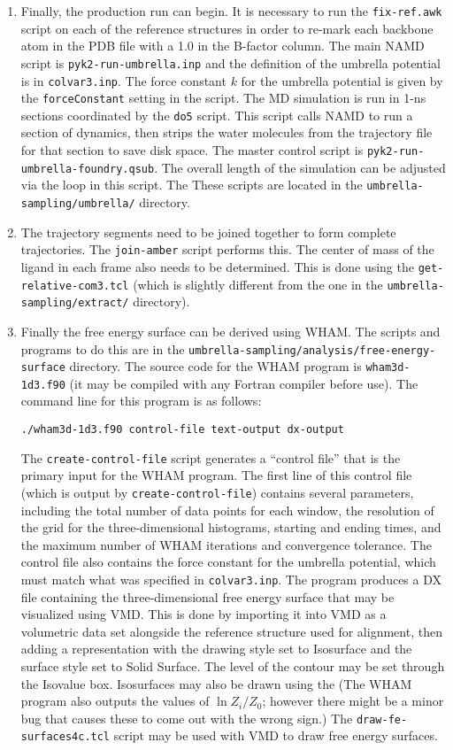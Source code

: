 \documentclass{article}      %
\begin{document}
\begin{enumerate}
\item Finally, the production run can begin.  It is necessary to run the \verb+fix-ref.awk+ script on each of the reference structures in order to re-mark each backbone atom in the PDB file with a 1.0 in the B-factor column.  The main NAMD script is \verb+pyk2-run-umbrella.inp+ and the definition of the umbrella potential is in \verb+colvar3.inp+.   The force constant $k$ for the umbrella potential is given by the \verb+forceConstant+ setting in the script.  The MD simulation is run in 1-ns sections coordinated by the \verb+do5+ script.   This script calls NAMD to run a section of dynamics, then strips the water molecules from the trajectory file for that section to save disk space.  The master control script is \verb+pyk2-run-umbrella-foundry.qsub+.  The overall length of the simulation can be adjusted via the loop in this script.   The These scripts are located in the \verb+umbrella-sampling/umbrella/+ directory.
 
\item The trajectory segments need to be joined together to form complete trajectories.  The \verb+join-amber+ script performs this.  The center of mass of the ligand in each frame also needs to be determined.  This is done using the \verb+get-relative-com3.tcl+ (which is slightly different from the one in the \verb+umbrella-sampling/extract/+ directory).  

\item Finally the free energy surface can be derived using WHAM.   The scripts and programs to do this are in the \verb+umbrella-sampling/analysis/free-energy-surface+ directory.  The source code for the WHAM program is \verb+wham3d-1d3.f90+ (it may be compiled with any Fortran compiler before use).   The command line for this program is as follows:
\begin{verbatim}
./wham3d-1d3.f90 control-file text-output dx-output
\end{verbatim}
The \verb+create-control-file+ script generates a ``control file'' that is the primary input for the WHAM program.   The first line of this control file (which is output by \verb+create-control-file+) contains several parameters, including the total number of data points for each window, the resolution of the grid for the three-dimensional histograms, starting and ending times, and the maximum number of WHAM iterations and convergence tolerance.  The control file also contains the force constant for the umbrella potential, which must match what was specified in \verb+colvar3.inp+.  The program produces a DX file containing the three-dimensional free energy surface that may be visualized using VMD.  This is done by importing it into VMD as a volumetric data set alongside the reference structure used for alignment, then adding a representation with the drawing style set to Isosurface and the surface style set to Solid Surface.  The level of the contour may be set through the Isovalue box.  Isosurfaces may also be drawn using the (The WHAM program also outputs the values of $\ln Z_i/Z_0$; however there might be a minor bug that causes these to come out with the wrong sign.)  The \verb+draw-fe-surfaces4c.tcl+ script may be used with VMD to draw free energy surfaces.  


\end{enumerate}
\end{document}
